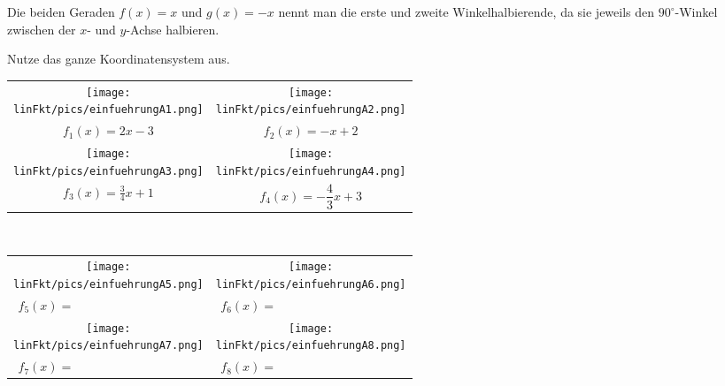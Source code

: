 \medskip

Die beiden Geraden \(f(x)=x\) und \(g(x)=-x\) nennt man die erste und zweite Winkelhalbierende, da sie jeweils den \(90^\circ\)-Winkel zwischen der \(x\)- und \(y\)-Achse halbieren.
\newpage
\begin{Exercise}[title={Zeichne das Schaubild der folgenden Funktionen}, label=lineareFktEinfuehrungA1]

	Nutze das ganze Koordinatensystem aus.

	\begin{minipage}[t]{\textwidth}
		\begin{tabular}{cc}
			\centering
			\texttt{[image: \\linFkt/pics/einfuehrungA1.png]}&\texttt{[image: \\linFkt/pics/einfuehrungA2.png]}  \\
			$f_1(x)=2x-3$&	$f_2(x)=-x+2$  \\ \addlinespace[20pt]
			\texttt{[image: \\linFkt/pics/einfuehrungA3.png]}&\texttt{[image: \\linFkt/pics/einfuehrungA4.png]}  \\
			$f_3(x)=\frac{3}{4}x+1$&	$f_4(x)=-\dfrac{4}{3}x+3$  \\
		\end{tabular}
\end{minipage}
\end{Exercise}
\newpage
\begin{Exercise}[title={Bestimme die Funktionsgleichung}, label=lineareFktEinfuehrungA2]\\
	\begin{minipage}[t]{\textwidth}
		\begin{tabular}{cc}
			\centering
			\texttt{[image: \\linFkt/pics/einfuehrungA5.png]}&\texttt{[image: \\linFkt/pics/einfuehrungA6.png]}  \\
			$f_5(x)=\qquad\qquad\qquad\qquad\qquad$&	$f_6(x)=\qquad\qquad\qquad\qquad\qquad$  \\ \addlinespace[20pt]
			\texttt{[image: \\linFkt/pics/einfuehrungA7.png]}&\texttt{[image: \\linFkt/pics/einfuehrungA8.png]}  \\
			$f_7(x)=\qquad\qquad\qquad\qquad\qquad$&	$f_8(x)=\qquad\qquad\qquad\qquad\qquad$  \\
		\end{tabular}
\end{minipage}
\end{Exercise}
\newpage
